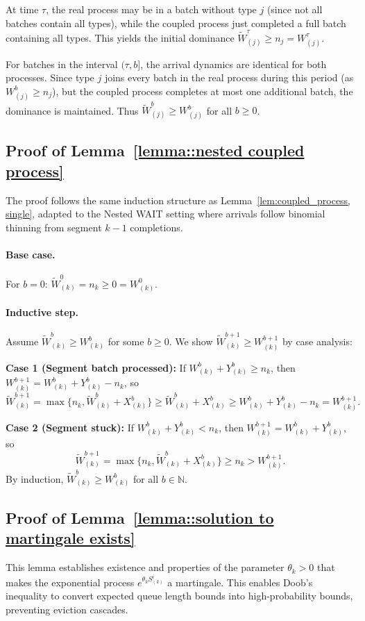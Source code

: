 At time $\tau$, the real process may be in a batch without type $j$ (since not all batches contain all types), while the coupled process just completed a full batch containing all types. This yields the initial dominance $\tilde{W}_{(j)}^\tau\geq n_j = W_{(j)}^\tau$.

For batches in the interval $(\tau, b]$, the arrival dynamics are identical for both processes. Since type $j$ joins every batch in the real process during this period (as $W^b_{(j)}\geq n_j$), but the coupled process completes at most one additional batch, the dominance is maintained. Thus $\tilde{W}^b_{(j)}\geq W^b_{(j)}$ for all $b\geq 0$. 

\subsection{Proof of Lemma~\ref{lemma::nested coupled process}}\label{appendix_lemma::proof of nested coupled process}
The proof follows the same induction structure as Lemma~\ref{lem:coupled_process, single}, adapted to the Nested WAIT setting where arrivals follow binomial thinning from segment $k-1$ completions.

\paragraph{Base case.} For $b = 0$: $\tilde{W}_{(k)}^0 = n_{k}\geq 0=W_{(k)}^0$.

\paragraph{Inductive step.} Assume $\tilde{W}^b_{(k)}\geq W^b_{(k)}$ for some $b\geq 0$. We show $\tilde{W}^{b+1}_{(k)}\geq W^{b+1}_{(k)}$ by case analysis:

\textbf{Case 1 (Segment batch processed):} If $W^b_{(k)}+ Y^b_{(k)}\geq n_k$, then $W^{b+1}_{(k)}= W^{b}_{(k)}+Y^b_{(k)} - n_k$, so
$$ \tilde{W}^{b+1}_{(k)}=  \max\{ n_{k},\tilde{W}^{b}_{(k)} + X^b_{(k)}\} \geq \tilde{W}^{b}_{(k)} + X^b_{(k)}\geq {W}^{b}_{(k)} + Y^b_{(k)}-n_k=W^{b+1}_{(k)}.$$

\textbf{Case 2 (Segment stuck):} If $W^b_{(k)}+ Y^b_{(k)}<n_k$, then $W^{b+1}_{(k)}= W^{b}_{(k)}+Y^b_{(k)}$, so
$$\tilde{W}^{b+1}_{(k)}=  \max\{ n_{k},\tilde{W}^{b}_{(k)} + X^b_{(k)}\} \geq n_{k}> W^{b+1}_{(k)}.$$
By induction, $\tilde{W}^b_{(k)}\geq W^b_{(k)}$ for all $b\in \mathbb{N}$.

\subsection{Proof of Lemma~\ref{lemma::solution to martingale exists}}\label{appendix_lemma::proof of solution to martingale exists}
This lemma establishes existence and properties of the parameter $\theta_k>0$ that makes the exponential process $e^{\theta_k S^i_{(k)}}$ a martingale. This enables Doob's inequality to convert expected queue length bounds into high-probability bounds, preventing eviction cascades.

